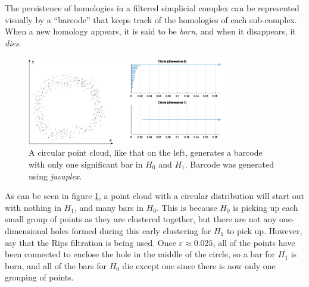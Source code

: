 \documentclass[a4paper,12pt]{report}
\begin{document}
The persistence of homologies in a filtered simplicial complex can be represented visually by a ``barcode'' that keeps track of the homologies of each sub-complex. When a new homology appears, it is said to be \textit{born}, and when it disappears, it \textit{dies}.
\begin{figure}[!htbp]
 \centering
 \includegraphics[width=0.8\textwidth]{circle_barcode_pc.pdf}
 \caption{\label{fig:barcode} A circular point cloud, like that on the left, generates a barcode with only one significant bar in $H_0$ and $H_1$. Barcode was generated using \textit{javaplex}\cite{Javaplex}.}
\end{figure}
\doublespacing
As can be seen in figure \ref{fig:barcode}, a point cloud with a circular distribution will start out with nothing in $H_1$, and many bars in $H_0$. This is because $H_0$ is picking up each small group of points as they are clustered together, but there are not any one-dimensional holes formed during this early clustering for $H_1$ to pick up. However, say that the Rips filtration is being used. Once $\varepsilon\approx0.025$, all of the points have been connected to enclose the hole in the middle of the circle, so a bar for $H_1$ is born, and all of the bars for $H_0$ die except one since there is now only one grouping of points. 

\end{document}
